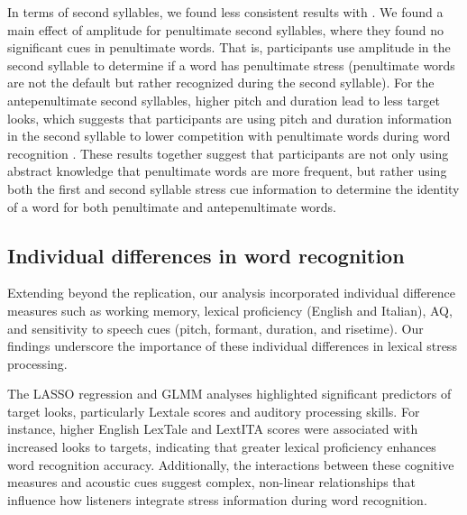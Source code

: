 In terms of second syllables, we found less consistent results with \cite{Sulpizio_McQueen_2012}. We found a main effect of amplitude for penultimate second syllables, where they found no significant cues in penultimate words. That is, participants use amplitude in the second syllable to determine if a word has penultimate stress (penultimate words are not the default but rather recognized during the second syllable). For the antepenultimate second syllables, higher pitch and duration lead to less target looks, which suggests that participants are using pitch and duration information in the second syllable to lower competition with penultimate words during word recognition \cite{McMurray2019}. These results together suggest that participants are not only using abstract knowledge that penultimate words are more frequent, but rather using both the first and second syllable stress cue information to determine the identity of a word for both penultimate and antepenultimate words.

\subsection{Individual differences in word recognition}
Extending beyond the replication, our analysis incorporated individual difference measures such as working memory, lexical proficiency (English and Italian), AQ, and sensitivity to speech cues (pitch, formant, duration, and risetime). Our findings underscore the importance of these individual differences in lexical stress processing.

The LASSO regression and GLMM analyses highlighted significant predictors of target looks, particularly Lextale scores and auditory processing skills. For instance, higher English LexTale and LextITA scores were associated with increased looks to targets, indicating that greater lexical proficiency enhances word recognition accuracy. Additionally, the interactions between these cognitive measures and acoustic cues suggest complex, non-linear relationships that influence how listeners integrate stress information during word recognition.


